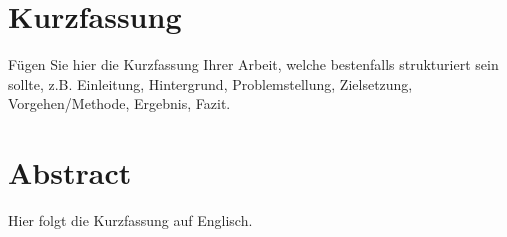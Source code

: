 \chapter*{Kurzfassung}
Fügen Sie hier die Kurzfassung Ihrer Arbeit, welche bestenfalls strukturiert sein sollte, z.B. Einleitung, Hintergrund, Problemstellung, Zielsetzung, Vorgehen/Methode, Ergebnis, Fazit. 


\newpage
\chapter*{Abstract}
Hier folgt die Kurzfassung auf Englisch.
